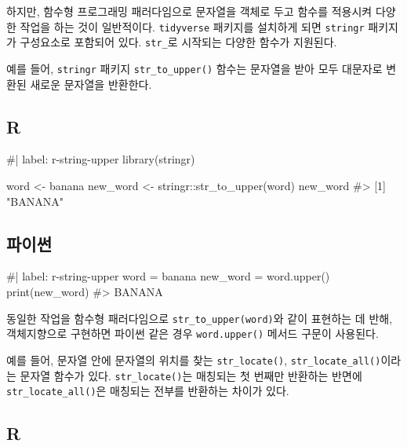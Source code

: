 \documentclass[
  letterpaper,
]{book}
\newenvironment{Shaded}{\begin{snugshade}}{\end{snugshade}}
\newcommand{\NormalTok}[1]{\textcolor[rgb]{0.00,0.23,0.31}{#1}}
\begin{document}
하지만, 함수형 프로그래밍 패러다임으로 문자열을 객체로 두고 함수를
적용시켜 다양한 작업을 하는 것이 일반적이다. \texttt{tidyverse} 패키지를
설치하게 되면 \texttt{stringr} 패키지가 구성요소로 포함되어 있다.
\texttt{str\_}로 시작되는 다양한 함수가 지원된다. 

예를 들어, \texttt{stringr} 패키지 \texttt{str\_to\_upper()} 함수는
문자열을 받아 모두 대문자로 변환된 새로운 문자열을 반환한다.

\subsection{R}

\begin{Shaded}
\begin{Highlighting}[]
\NormalTok{\#| label: r{-}string{-}upper}
\NormalTok{library(stringr)}

\NormalTok{word \textless{}{-} \textquotesingle{}banana\textquotesingle{}}
\NormalTok{new\_word \textless{}{-} stringr::str\_to\_upper(word)}
\NormalTok{new\_word}
\NormalTok{\#\textgreater{} [1] "BANANA"}
\end{Highlighting}
\end{Shaded}

\subsection{파이썬}

\begin{Shaded}
\begin{Highlighting}[]
\NormalTok{\#| label: r{-}string{-}upper}
\NormalTok{word = \textquotesingle{}banana\textquotesingle{}}
\NormalTok{new\_word = word.upper()}
\NormalTok{print(new\_word)}
\NormalTok{\#\textgreater{} BANANA}
\end{Highlighting}
\end{Shaded}

동일한 작업을 함수형 패러다임으로 \texttt{str\_to\_upper(word)}와 같이
표현하는 데 반해, 객체지향으로 구현하면 파이썬 같은 경우
\texttt{word.upper()} 메서드 구문이 사용된다.

예를 들어, 문자열 안에 문자열의 위치를 찾는 \texttt{str\_locate()},
\texttt{str\_locate\_all()}이라는 문자열 함수가 있다.
\texttt{str\_locate()}는 매칭되는 첫 번째만 반환하는 반면에
\texttt{str\_locate\_all()}은 매칭되는 전부를 반환하는 차이가 있다.

\subsection{R}
\end{document}
